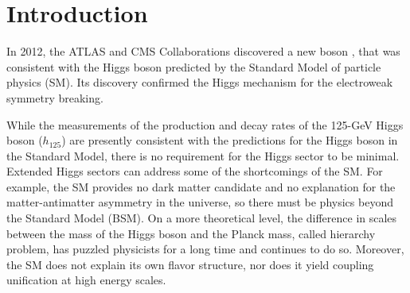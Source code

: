 \documentclass[a4paper, oneside, 11pt, openright]{book}
\begin{document}
	\clearpage\null\thispagestyle{empty}\newpage
	
	\tableofcontents
	
	\chapter*{Introduction}
	
		In 2012, the ATLAS and CMS Collaborations discovered a new boson \cite{higgs_atlas},\cite{higgs_cms} that was consistent with the Higgs boson predicted by the Standard Model of particle physics (SM). Its discovery confirmed the Higgs mechanism for the electroweak symmetry breaking.
		
		While the measurements of the production and decay rates of the 125-GeV Higgs boson ($h_{125}$) are presently consistent with the predictions for the Higgs boson in the Standard Model, there is no requirement for the Higgs sector to be minimal. Extended Higgs sectors can address some of the shortcomings of the SM. For example, the SM provides no dark matter candidate and no explanation for the matter-antimatter asymmetry in the universe, so there must be physics beyond the Standard Model (BSM). On a more theoretical level, %
		the difference in scales between the mass of the Higgs boson and the Planck mass, called hierarchy problem, has puzzled physicists for a long time and continues to do so. Moreover, the SM does not explain its own flavor structure, nor does it yield coupling unification at high energy scales\cite{ext_higgs}.
		
\end{document}
